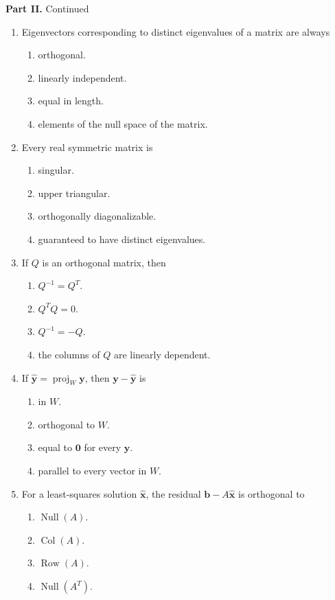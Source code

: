 \documentclass[11pt,a4paper]{article}
\newcommand{\parttitle}[2]{%
  \vspace{1mm}
  {\color{examblue}\Large\bfseries #1}\quad
  {\color{examblue}\large #2}\par\vspace{3mm}
}
\begin{document}
\newpage
\parttitle{Part II.}{Continued}

\begin{enumerate}[label=\arabic*.,start=16]
  \item Eigenvectors corresponding to distinct eigenvalues of a matrix are always
    \begin{enumerate}
      \item orthogonal. \item linearly independent.
      \item equal in length. \item elements of the null space of the matrix.
    \end{enumerate}

  \item Every real symmetric matrix is
    \begin{enumerate}
      \item singular. \item upper triangular.
      \item orthogonally diagonalizable. \item guaranteed to have distinct eigenvalues.
    \end{enumerate}

  \item If $Q$ is an orthogonal matrix, then
    \begin{enumerate}
      \item $Q^{-1}=Q^{T}$. \item $Q^{T}Q=0$.
      \item $Q^{-1}=-Q$. \item the columns of $Q$ are linearly dependent.
    \end{enumerate}

  \item If $\widehat{\mathbf y}=\operatorname{proj}_{W}\mathbf y$, then
        $\mathbf y-\widehat{\mathbf y}$ is
    \begin{enumerate}
      \item in $W$. \item orthogonal to $W$.
      \item equal to $\mathbf 0$ for every $\mathbf y$. \item parallel to every vector in $W$.
    \end{enumerate}

  \item For a least-squares solution $\widehat{\mathbf x}$, the residual
        $\mathbf b-A\widehat{\mathbf x}$ is orthogonal to
    \begin{enumerate}
      \item $\operatorname{Null}(A)$. \item $\operatorname{Col}(A)$.
      \item $\operatorname{Row}(A)$. \item $\operatorname{Null}(A^{T})$.
    \end{enumerate}
\end{enumerate}
\end{document}
